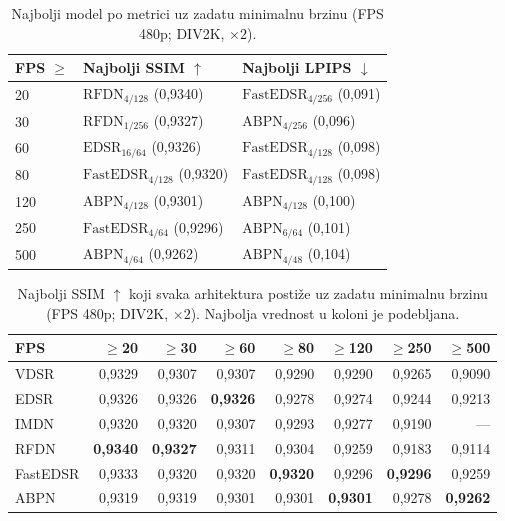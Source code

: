 
\begin{table}[H]
    \centering
    \caption{Najbolji model po metrici uz zadatu minimalnu brzinu (FPS 480p; DIV2K, $\times2$).}
    \label{tab:fps_thr_summary_single}
    \small
    \setlength{\tabcolsep}{4pt}
    \begin{tabular}{@{}lll@{}}
        \toprule
        FPS $\geq$ & Najbolji SSIM $\uparrow$ & Najbolji LPIPS $\downarrow$ \\
        \midrule
        20 & $\text{RFDN}_{\text{4/128}}$ (0,9340) & $\text{FastEDSR}_{\text{4/256}}$ (0,091) \\
        30 & $\text{RFDN}_{\text{1/256}}$ (0,9327) & $\text{ABPN}_{\text{4/256}}$ (0,096) \\
        60 & $\text{EDSR}_{\text{16/64}}$ (0,9326) & $\text{FastEDSR}_{\text{4/128}}$ (0,098) \\
        80 & $\text{FastEDSR}_{\text{4/128}}$ (0,9320) & $\text{FastEDSR}_{\text{4/128}}$ (0,098) \\
        120 & $\text{ABPN}_{\text{4/128}}$ (0,9301) & $\text{ABPN}_{\text{4/128}}$ (0,100) \\
        250 & $\text{FastEDSR}_{\text{4/64}}$ (0,9296) & $\text{ABPN}_{\text{6/64}}$ (0,101) \\
        500 & $\text{ABPN}_{\text{4/64}}$ (0,9262) & $\text{ABPN}_{\text{4/48}}$ (0,104) \\
        \bottomrule
    \end{tabular}
\end{table}

\begin{table}[H]
    \centering
    \caption{Najbolji SSIM $\uparrow$ koji svaka arhitektura postiže uz zadatu minimalnu brzinu (FPS 480p; DIV2K, $\times2$). Najbolja vrednost u koloni je podebljana.}
    \label{tab:fps_thr_SSIM_single}
    \footnotesize
    \setlength{\tabcolsep}{3pt}
    \begin{tabular}{@{}lrrrrrrr@{}}
        \toprule
        FPS & $\geq$20 & $\geq$30 & $\geq$60 & $\geq$80 & $\geq$120 & $\geq$250 & $\geq$500 \\
        \midrule
        VDSR & 0,9329 & 0,9307 & 0,9307 & 0,9290 & 0,9290 & 0,9265 & 0,9090 \\
        EDSR & 0,9326 & 0,9326 & \textbf{0,9326} & 0,9278 & 0,9274 & 0,9244 & 0,9213 \\
        IMDN & 0,9320 & 0,9320 & 0,9307 & 0,9293 & 0,9277 & 0,9190 & --- \\
        RFDN & \textbf{0,9340} & \textbf{0,9327} & 0,9311 & 0,9304 & 0,9259 & 0,9183 & 0,9114 \\
        FastEDSR & 0,9333 & 0,9320 & 0,9320 & \textbf{0,9320} & 0,9296 & \textbf{0,9296} & 0,9259 \\
        ABPN & 0,9319 & 0,9319 & 0,9301 & 0,9301 & \textbf{0,9301} & 0,9278 & \textbf{0,9262} \\
        \bottomrule
    \end{tabular}
\end{table}

